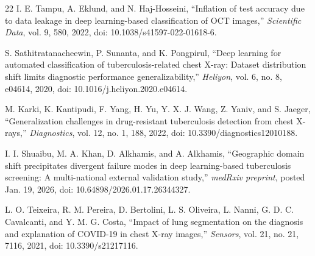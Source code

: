 \documentclass[journal]{IEEEtran}
\begin{document}
\begin{thebibliography}{22}
I. E. Tampu, A. Eklund, and N. Haj-Hosseini, ``Inflation of test accuracy due
to data leakage in deep learning-based classification of OCT images,''
\emph{Scientific Data}, vol. 9, 580, 2022, doi: 10.1038/s41597-022-01618-6.

S. Sathitratanacheewin, P. Sunanta, and K. Pongpirul, ``Deep learning for
automated classification of tuberculosis-related chest X-ray: Dataset
distribution shift limits diagnostic performance generalizability,''
\emph{Heliyon}, vol. 6, no. 8, e04614, 2020, doi:
10.1016/j.heliyon.2020.e04614.

M. Karki, K. Kantipudi, F. Yang, H. Yu, Y. X. J. Wang, Z. Yaniv, and S. Jaeger,
``Generalization challenges in drug-resistant tuberculosis detection from
chest X-rays,'' \emph{Diagnostics}, vol. 12, no. 1, 188, 2022, doi:
10.3390/diagnostics12010188.

I. I. Shuaibu, M. A. Khan, D. Alkhamis, and A. Alkhamis, ``Geographic domain
shift precipitates divergent failure modes in deep learning-based tuberculosis
screening: A multi-national external validation study,'' \emph{medRxiv
preprint}, posted Jan. 19, 2026, doi: 10.64898/2026.01.17.26344327.

L. O. Teixeira, R. M. Pereira, D. Bertolini, L. S. Oliveira, L. Nanni,
G. D. C. Cavalcanti, and Y. M. G. Costa, ``Impact of lung segmentation on the
diagnosis and explanation of COVID-19 in chest X-ray images,'' \emph{Sensors},
vol. 21, no. 21, 7116, 2021, doi: 10.3390/s21217116.

\end{thebibliography}
\end{document}
